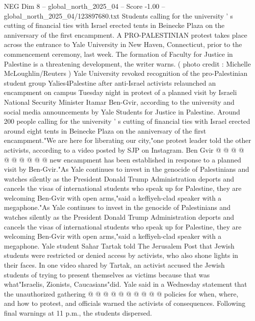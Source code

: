 \begin{textsample}{NEG Dim 8 – global\_north\_2025\_04 – Score -1.00 – global\_north\_2025\_04/123897680.txt}  \label{ex:f8_neg_420}
Students calling for the university ' s cutting of financial ties with Israel erected tents in Beinecke Plaza on the anniversary of the first encampment.
A PRO-PALESTINIAN protest takes place across the entrance to Yale University in New Haven, Connecticut, prior to the commencement ceremony, last week.
The formation of Faculty for Justice in Palestine is a threatening development, the writer warns. ( photo credit : Michelle McLoughlin/Reuters ) Yale University revoked recognition of the pro-Palestinian student group Yalies4Palestine after anti-Israel activists relaunched an encampment on campus Tuesday night in protest of a planned visit by Israeli National Security Minister Itamar Ben-Gvir, according to the university and social media announcements by Yale Students for Justice in Palestine.
Around 200 people calling for the university ' s cutting of financial ties with Israel erected around eight tents in Beinecke Plaza on the anniversary of the first encampment."We are here for liberating our city,"one protest leader told the other activists, according to a video posted by SJP on Instagram.
Ben Gvir @ @ @ @ @ @ @ @ @ @ new encampment has been established in response to a planned visit by Ben-Gvir."As Yale continues to invest in the genocide of Palestinians and watches silently as the President Donald Trump Administration deports and cancels the visas of international students who speak up for Palestine, they are welcoming Ben-Gvir with open arms,"said a keffiyeh-clad speaker with a megaphone."As Yale continues to invest in the genocide of Palestinians and watches silently as the President Donald Trump Administration deports and cancels the visas of international students who speak up for Palestine, they are welcoming Ben-Gvir with open arms,"said a keffiyeh-clad speaker with a megaphone.
Yale student Sahar Tartak told The Jerusalem Post that Jewish students were restricted or denied access by activists, who also shone lights in their faces.
In one video shared by Tartak, an activist accused the Jewish students of trying to present themselves as victims because that was what"Israelis, Zionists, Caucasians"did.
Yale said in a Wednesday statement that the unauthorized gathering @ @ @ @ @ @ @ @ @ @ policies for when, where, and how to protest, and officials warned the activists of consequences.
Following final warnings at 11 p.m., the students dispersed.

\end{textsample}
